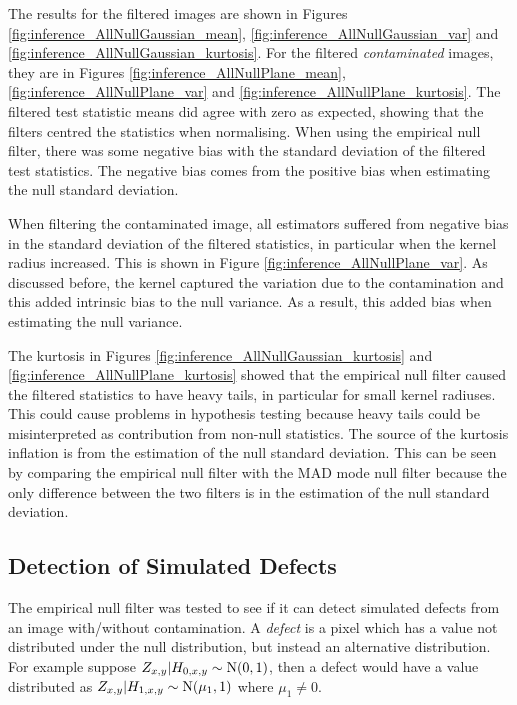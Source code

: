 The results for the filtered images are shown in Figures \ref{fig:inference_AllNullGaussian_mean}, \ref{fig:inference_AllNullGaussian_var} and \ref{fig:inference_AllNullGaussian_kurtosis}. For the filtered \emph{contaminated} images, they are in Figures \ref{fig:inference_AllNullPlane_mean}, \ref{fig:inference_AllNullPlane_var} and \ref{fig:inference_AllNullPlane_kurtosis}. The filtered test statistic means did agree with zero as expected, showing that the filters centred the statistics when normalising. When using the empirical null filter, there was some negative bias with the standard deviation of the filtered test statistics. The negative bias comes from the positive bias when estimating the null standard deviation.

When filtering the contaminated image, all estimators suffered from negative bias in the standard deviation of the filtered statistics, in particular when the kernel radius increased. This is shown in Figure \ref{fig:inference_AllNullPlane_var}. As discussed before, the kernel captured the variation due to the contamination and this added intrinsic bias to the null variance. As a result, this added bias when estimating the null variance.

The kurtosis in Figures \ref{fig:inference_AllNullGaussian_kurtosis} and \ref{fig:inference_AllNullPlane_kurtosis} showed that the empirical null filter caused the filtered statistics to have heavy tails, in particular for small kernel radiuses. This could cause problems in hypothesis testing because heavy tails could be misinterpreted as contribution from non-null statistics. The source of the kurtosis inflation is from the estimation of the null standard deviation. This can be seen by comparing the empirical null filter with the MAD mode null filter because the only difference between the two filters is in the estimation of the null standard deviation.

\afterpage{\clearpage}
\subsection{Detection of Simulated Defects}

The empirical null filter was tested to see if it can detect simulated defects from an image with/without contamination. A \emph{defect} is a pixel which has a value not distributed under the null distribution, but instead an alternative distribution. For example suppose $Z_{x,y}|H_{0,x,y}\sim\operatorname{N}(0,1)$, then a defect would have a value distributed as $Z_{x,y}|H_{1,x,y}\sim\operatorname{N}(\mu_{1},1)$ where $\mu_1\neq0$.

